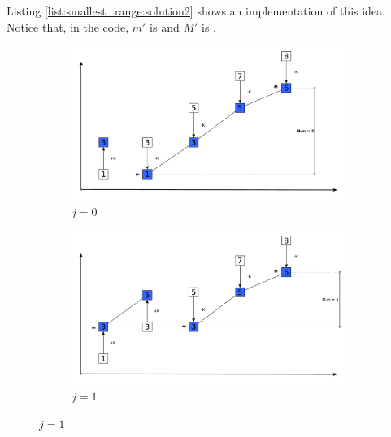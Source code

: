 Listing \ref{list:smallest_range:solution2} shows an implementation of this idea. Notice that, in
the code, $m'$ is  and $M'$ is .


\begin{figure}
	\centering
	\vspace{-0.5in}
	
	\begin{subfigure}[t]{0.99\textwidth}
			\centering
			\includegraphics[width=1\linewidth]{sources/smallest_range/images/bars2}
			\caption{$j=0$}
			\label{fig:smallest_range:bars2}
	\end{subfigure}
	
	\begin{subfigure}[t]{0.99\textwidth}
		\centering
		\includegraphics[width=1\linewidth]{sources/smallest_range/images/bars3}
		\caption{$j=1$}
		\label{fig:smallest_range:bars3}
	\end{subfigure}


\end{figure}
